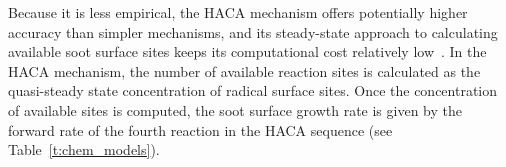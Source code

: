 \documentclass[preprint,letterpaper]{elsarticle}
\begin{document}
Because it is less empirical, the HACA mechanism offers potentially higher accuracy than simpler mechanisms, and its steady-state approach to calculating available soot surface sites keeps its computational cost relatively low~\cite{Appel_2000}. In the HACA mechanism, the number of available reaction sites is calculated as the quasi-steady state concentration of radical surface sites. Once the concentration of available sites is computed, the soot surface growth rate is given by the forward rate of the fourth reaction in the HACA sequence (see Table~\ref{t:chem_models}).



\end{document}
